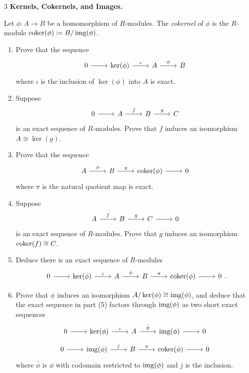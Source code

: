 \documentclass[Notebook.tex]{subfiles}
\begin{document}
\begin{problem}{3} \textbf{Kernels, Cokernels, and Images.} 
    
    Let $\phi:A\to B$ be a homomorphism of $R$-modules. The \emph{cokernel} of $\phi$ is the $R$-module $\operatorname{coker}(\phi)\coloneqq B/\operatorname{img}(\phi)$.

    \begin{enumerate}
        \item Prove that the sequence
        \[
        \begin{tikzcd}
        0 \arrow[r] & \ker(\phi) \arrow[r, "\iota"] & A \arrow[r, "\phi"] & B 
        \end{tikzcd}
        \]
        where $\iota$ is the inclusion of $\ker(\phi)$ into $A$ is exact.
        \item Suppose
        \[
        \begin{tikzcd}
        0 \arrow[r] & A \arrow[r, "f"] & B \arrow[r, "g"] & C
        \end{tikzcd}
        \]
        is an exact sequence of $R$-modules.  Prove that $f$ induces an isomorphism $A\cong \ker(g)$.

        \item Prove that the sequence
        \[
        \begin{tikzcd}
        A \arrow[r, "\phi"] & B \arrow[r, "\pi"] & \coker(\phi) \arrow[r] & 0
        \end{tikzcd}
        \]
        where $\pi$ is the natural quotient map is exact.
        \item Suppose
        \[
        \begin{tikzcd}
        A \arrow[r, "f"] & B \arrow[r, "g"] & C \arrow[r] & 0
        \end{tikzcd}
        \]
        is an exact sequence of $R$-modules. Prove that $g$ induces an isomorphism $\operatorname{coker}(f)\cong C$.

        \item Deduce there is an exact sequence of $R$-modules
        \[
        \begin{tikzcd}
        0 \arrow[r] & \ker(\phi) \arrow[r, "\iota"] & A \arrow[r, "\phi"] & B \arrow[r, "\pi"] & \coker(\phi) \arrow[r] & 0 
        \end{tikzcd}.
        \]

        \item Prove that $\phi$ induces an isomorphism $A/\ker(\phi)\cong\operatorname{img}(\phi)$, and deduce that the exact sequence in part (5) factors through $\operatorname{img}(\phi)$ as two short exact sequences
        \[
        \begin{tikzcd}
        0 \arrow[r] & \ker(\phi) \arrow[r, "\iota"] & A \arrow[r, "\bar{\phi}"] & \img(\phi) \arrow[r] & 0
        \end{tikzcd}\]
        \quad
        \[\begin{tikzcd}
        0 \arrow[r] & \img(\phi) \arrow[r, "j"] & B \arrow[r, "\pi"] & \coker(\phi) \arrow[r] & 0
        \end{tikzcd}
        \]
        where $\bar{\phi}$ is $\phi$ with codomain restricted to $\operatorname{img}(\phi)$ and $j$ is the inclusion.
    \end{enumerate}
\end{problem}
\end{document}
